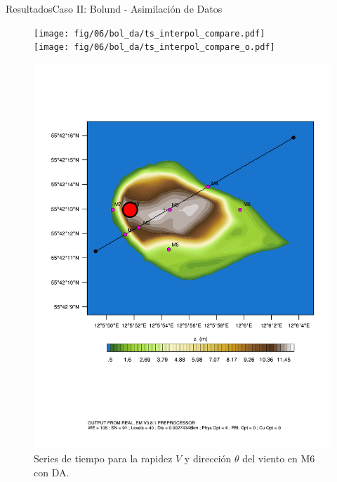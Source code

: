 \documentclass[mathserif,10pt]{beamer}
\begin{document}
\begin{frame}{Resultados}{Caso II: Bolund - Asimilación de Datos}
	\begin{figure}[H]
		\begin{minipage}{0.65\linewidth}
			\texttt{[image: fig/06/bol\_da/ts\_interpol\_compare.pdf]}\\%
			\texttt{[image: fig/06/bol\_da/ts\_interpol\_compare\_o.pdf]}%
		\end{minipage}%
		\begin{minipage}{0.35\linewidth}
			\centering
			\includegraphics[width=1\linewidth,page=1,trim={3.5cm 9.3cm 0.8cm 3.8cm},clip]{fig/05/ppt/bol_control_point6.pdf}%
		\end{minipage}%
		\vspace{-2mm}\caption{Series de tiempo para la rapidez $V$ y dirección $\theta$ del viento en M6 con DA.}
		\label{fig:06_bol_da_ts_m6}
	\end{figure}
\end{frame}
\end{document}
